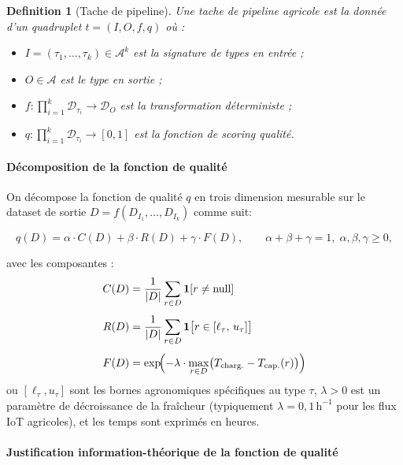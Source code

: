 \documentclass[12pt]{article}
\newtheorem{definition}{Definition}[section]
\begin{document}
\begin{definition}[Tache de pipeline]
	\label{def:task}
	Une \emph{tache de pipeline agricole} est la donnée d'un quadruplet $t = (I, O, f, q)$ où :
	\begin{itemize}
		\item $I = (\tau_1,\ldots,\tau_k) \in \mathcal{A}^k$ est la signature
		de types en entrée ;
		\item $O \in \mathcal{A}$ est le type en sortie ;
		\item $f : \prod_{i=1}^k \mathcal{D}_{\tau_i} \to \mathcal{D}_O$ est
		la transformation déterministe ;
		\item $q : \prod_{i=1}^k \mathcal{D}_{\tau_i} \to [0,1]$ est la
		fonction de scoring qualité.
	\end{itemize}
\end{definition}

\paragraph{Décomposition de la fonction de qualité}
On décompose la fonction de qualité $q$ en trois dimension mesurable sur le dataset de sortie $D = f(D_{I_1},\ldots,D_{I_k})$  comme suit:

\begin{equation}
	q(D) = \alpha \cdot C(D) + \beta \cdot R(D) + \gamma \cdot F(D),
	\qquad \alpha+\beta+\gamma=1,\; \alpha,\beta,\gamma \geq 0,
	\label{eq:qtask}
\end{equation}

avec les composantes :
	\begin{align}
	C(D) &= \frac{1}{|D|}\sum_{r \in D} \mathbf{1}[r \neq \text{null}]
	\label{eq:C}\\[4pt]
	R(D) &= \frac{1}{|D|}\sum_{r \in D}
	\mathbf{1}\bigl[r \in [\ell_\tau,\, u_\tau]\bigr]
	\label{eq:R}\\[4pt]
	F(D) &= \exp\!\Bigl(-\lambda \cdot
	\max_{r \in D}\bigl(T_{\text{charg.}} - T_{\text{cap.}}(r)\bigr)\Bigr)
	\label{eq:F}
\end{align}
	ou $[\ell_\tau, u_\tau]$ sont les bornes agronomiques spécifiques au type $\tau$, $\lambda > 0$ est un paramètre de décroissance de la fraîcheur   (typiquement $\lambda = 0{,}1\,\text{h}^{-1}$ pour les flux IoT agricoles), et les temps sont exprimés en heures.


\paragraph{Justification information-théorique de la fonction de qualité}
\end{document}
